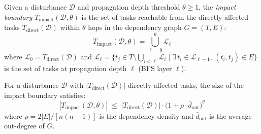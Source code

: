 \documentclass[manuscript,screen,review]{acmart}
\begin{document}
\begin{definition}
\label{def:impact_boundary}
Given a disturbance $\mathcal{D}$ and propagation depth threshold $\theta \geq 1$,
the \textit{impact boundary} $T_{\mathrm{impact}}(\mathcal{D}, \theta)$ is the set
of tasks reachable from the directly affected tasks $T_{\mathrm{direct}}(\mathcal{D})$
within $\theta$ hops in the dependency graph $G = (T, E)$:
\begin{equation}
    T_{\mathrm{impact}}(\mathcal{D}, \theta)
    = \bigcup_{\ell=0}^{\theta} \mathcal{L}_\ell
    \label{eq:impact_boundary}
\end{equation}
where $\mathcal{L}_0 = T_{\mathrm{direct}}(\mathcal{D})$ and
$\mathcal{L}_\ell = \{t_j \in T \setminus \bigcup_{i<\ell}\mathcal{L}_i
\mid \exists\, t_i \in \mathcal{L}_{\ell-1},\, (t_i, t_j) \in E\}$
is the set of tasks at propagation depth $\ell$ (BFS layer $\ell$).
\end{definition}

\begin{theorem}
\label{thm:impact_bound}
\label{thm:impact_boundary}
For a disturbance $\mathcal{D}$ with $|T_{\mathrm{direct}}(\mathcal{D})|$ directly
affected tasks, the size of the impact boundary satisfies:
\begin{equation}
    |T_{\mathrm{impact}}(\mathcal{D}, \theta)|
    \;\leq\;
    |T_{\mathrm{direct}}(\mathcal{D})| \cdot
    \bigl(1 + \rho \cdot \bar{d}_{\mathrm{out}}\bigr)^{\theta}
    \label{eq:impact_bound}
\end{equation}
where $\rho = 2|E|/[n(n-1)]$ is the dependency density and
$\bar{d}_{\mathrm{out}}$ is the average out-degree of $G$.
\end{theorem}
\end{document}
